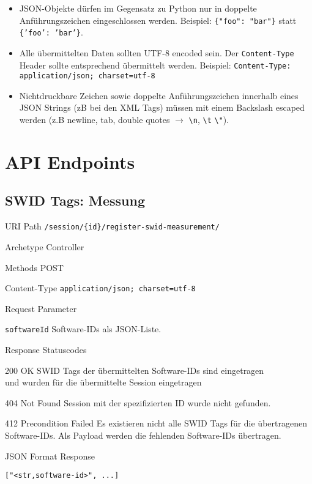 \documentclass[10pt,a4paper]{scrartcl}
\newcommand*{\escape}[1]{\texttt{\textbackslash#1}}
\begin{document}
\begin{itemize}
	\item JSON-Objekte dürfen im Gegensatz zu Python nur in doppelte
		Anführungszeichen eingeschlossen werden. Beispiel: \texttt{\{"foo": "bar"\}}
		statt \texttt{\{'foo': 'bar'\}}.
	\item Alle übermittelten Daten sollten UTF-8 encoded sein. Der
		\texttt{Content-Type} Header sollte entsprechend übermittelt werden.
		Beispiel: \texttt{Content-Type: application/json; charset=utf-8}
	\item Nichtdruckbare Zeichen sowie doppelte Anführungszeichen innerhalb eines
		JSON Strings (zB bei den XML Tags) müssen mit einem Backslash escaped werden
		(z.B newline, tab, double quotes $\rightarrow$ \escape{n}, \escape{t}
		\escape{"}).
\end{itemize}


\pagebreak
\section{API Endpoints}

\subsection{SWID Tags: Messung}
\label{api:measurement}

\begin{mdframed}[style=def]
\begin{description*}
	\item[URI Path] \texttt{/session/\{id\}/register-swid-measurement/}
	\item[Archetype] Controller
	\item[Methods] POST
	\item[Content-Type] \texttt{application/json; charset=utf-8}
	\item[Request Parameter] \hfill
	\begin{description*}
		\item[\texttt{softwareId}] Software-IDs als JSON-Liste.
	\end{description*}
	\item[Response Statuscodes] \hfill
		\begin{description*}
			\item[200 OK] SWID Tags der übermittelten Software-IDs sind eingetragen \\
				und wurden für die übermittelte Session eingetragen
			\item[404 Not Found] Session mit der spezifizierten ID wurde nicht gefunden. 
			\item[412 Precondition Failed] Es existieren nicht alle SWID Tags für die
				übertragenen Software-IDs. Als Payload werden die fehlenden Software-IDs
				übertragen.
		\end{description*}
	\item[JSON Format Response] \hfill
\begin{lstlisting}
["<str,software-id>", ...]
\end{lstlisting}
\end{description*}
\end{mdframed}
\end{document}
